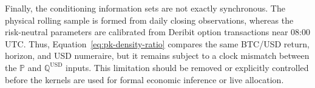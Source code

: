 Finally, the conditioning information sets are not exactly synchronous. The
physical rolling sample is formed from daily closing observations, whereas the
risk-neutral parameters are calibrated from Deribit option transactions near
08:00 UTC. Thus, Equation~\eqref{eq:pk-density-ratio} compares the same
BTC/USD return, horizon, and USD numeraire, but it remains subject to a clock
mismatch between the $\mathbb{P}$ and $\mathbb{Q}^{\mathrm{USD}}$ inputs. This limitation should
be removed or explicitly controlled before the kernels are used for formal
economic inference or live allocation.

\clearpage

